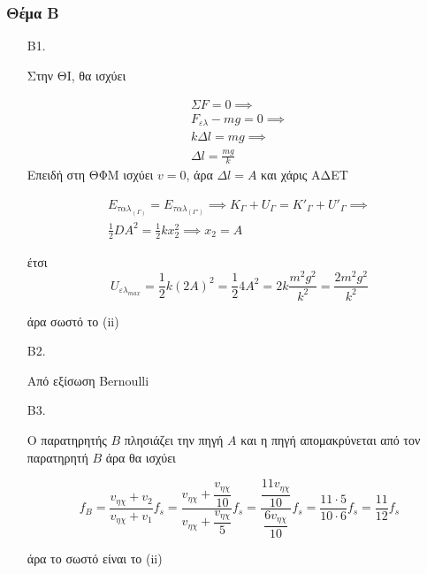 \documentclass[12pt]{article}
\begin{document}
  \part*{}

  \section*{Θέμα Β}
  \begin{enumerate}
    \item [B1.]

    Στην ΘΙ, θα ισχύει

    \begin{gather}
    ΣF=0 \implies \\ F_{ελ}-mg=0 \implies \\ kΔl=mg \implies \\ Δl=\frac{mg}{k}
    \end{gather}
    Επειδή στη ΘΦΜ ισχύει $v=0$, άρα $Δl=A$ και χάρις ΑΔΕΤ

    \begin{gather}
    E_{ταλ_{(Γ)}}=E_{ταλ_{(Γ')}} \implies K_Γ+U_Γ=K'_Γ+U'_Γ \implies \\ \frac{1}{2}DA^2=\frac{1}{2}kx_2^2 \implies x_2=A
    \end{gather}

    έτσι $$U_{ελ_{max}}=\frac{1}{2}k\left(2A\right)^2=\frac{1}{2}4A^2=2k\frac{m^2g^2}{k^2}=\frac{2m^2g^2}{k^2}$$

    άρα σωστό το (ii)

    \item [B2.]

    Από εξίσωση Bernoulli


    \item [B3.]

    Ο παρατηρητής $Β$ πλησιάζει την πηγή $Α$ και η πηγή απομακρύνεται από τον παρατηρητή $Β$ άρα θα ισχύει

    $$f_Β=\dfrac{v_{ηχ}+v_2}{v_{ηχ}+v_1}f_s=\dfrac{v_{ηχ}+\dfrac{v_{ηχ}}{10}}{v_{ηχ}+\dfrac{v_{ηχ}}{5}}f_s=\dfrac{\dfrac{11v_{ηχ}}{10}}{\dfrac{6v_{ηχ}}{10}}f_s=\dfrac{11\cdot5}{10\cdot6}f_s=\dfrac{11}{12}f_s $$

    άρα το σωστό είναι το (ii)
  \end{enumerate}
\end{document}
